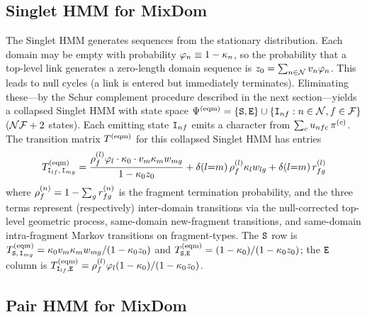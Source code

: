 \subsection{Singlet HMM for MixDom}

The Singlet HMM generates sequences from the stationary distribution.
Each domain may be empty with probability
$\varphi_n \equiv 1-\kappa_n$,
so the probability that a top-level link generates a zero-length domain sequence is
$z_0 = \sum_{n \in \mathcal{N}} v_n \varphi_n$.
This leads to null cycles (a link is entered but immediately terminates).
Eliminating these---by the Schur complement procedure described in the next section---yields
a collapsed Singlet HMM with state space
$\Psi^{(\mathrm{eqm})} = \{ {\tt S}, {\tt E} \} \cup \{ {\tt I}_{nf} : n \in \mathcal{N}, f \in \mathcal{F} \}$
($\mathcal{N}\mathcal{F} + 2$ states).
Each emitting state ${\tt I}_{nf}$ emits a character from
$\sum_c u_{nfc}\, \pi^{(c)}$.
The transition matrix $T^{(\mathrm{eqm})}$ for this collapsed Singlet HMM has entries
\[
T^{(\mathrm{eqm})}_{{\tt I}_{lf},\, {\tt I}_{mg}}
= \frac{\rho^{(l)}_f \varphi_l \cdot \kappa_0 \cdot v_m \kappa_m w_{mg}}{1 - \kappa_0 z_0}
+ \delta(l{=}m)\, \rho^{(l)}_f \kappa_l w_{lg}
+ \delta(l{=}m)\, r^{(l)}_{fg}
\]
where $\rho^{(n)}_f = 1 - \sum_{g} r^{(n)}_{fg}$
is the fragment termination probability,
and the three terms represent (respectively) inter-domain transitions via the null-corrected
top-level geometric process, same-domain new-fragment transitions, and same-domain intra-fragment Markov transitions on fragment-types.
The ${\tt S}$ row is $T^{(\mathrm{eqm})}_{{\tt S},\, {\tt I}_{mg}}
= \kappa_0 v_m \kappa_m w_{mg} / (1 - \kappa_0 z_0)$
and $T^{(\mathrm{eqm})}_{{\tt S},{\tt E}} = (1-\kappa_0) / (1 - \kappa_0 z_0)$;
the ${\tt E}$ column is $T^{(\mathrm{eqm})}_{{\tt I}_{lf},{\tt E}}
= \rho^{(l)}_f \varphi_l (1-\kappa_0) / (1 - \kappa_0 z_0)$.

\subsection{Pair HMM for MixDom}

